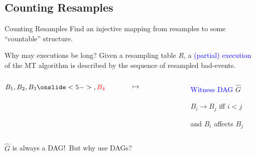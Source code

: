 \documentclass{beamer}
\def\spadding{\vspace{0.25cm}}
\def\b{\textcolor{blue}}
\def\r{\textcolor{red}}
\begin{document}
\subsection{Counting Resamples}
\begin{frame}{Counting Resamples}
Find an injective mapping from resamples to some ``countable'' structure.\pause

\begin{block}{Why may executions be long?}
Given a resampling table $R$, a \b{(partial) execution} of the MT algorithm is described by the sequence of resampled bad-events.\pause\spadding

\begin{columns}
\begin{column}{.15\textwidth}
\centering $B_1, B_2, B_3\onslide<5->{, \r{B_4}}$
\end{column}
\begin{column}{.0\textwidth}
\centering $\mapsto$
\end{column}\pause
\begin{column}{.2\textwidth}
\centering
\end{column}
\begin{column}{.3\textwidth}
\b{Witness DAG} $\hat{G}$

$B_i \longrightarrow B_j$ iff $i < j$\par and $B_i$ affects $B_j$
\end{column}
\end{columns}\pause\pause

\follows $\hat{G}$ is always a DAG!\pause\ But why use DAGs?
\end{block}
\end{frame}
\end{document}
